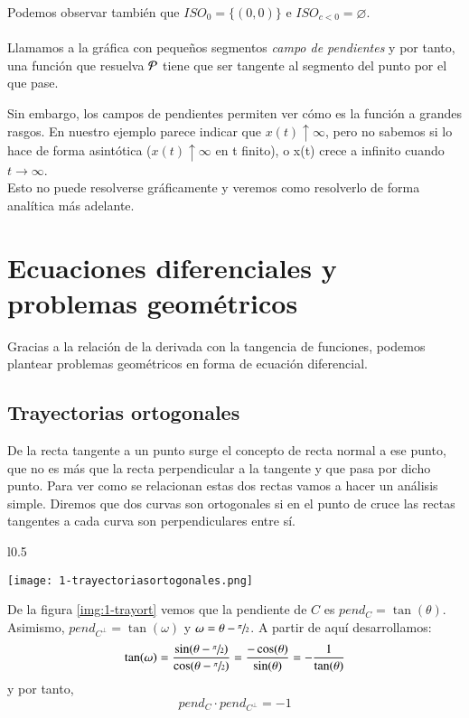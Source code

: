 \begin{eg}
\begin{minipage}[c]{0.65\textwidth}
        Podemos observar también que $ISO_0 = \{(0,0)\}$ e $ISO_{c < 0} = \varnothing$.\\\\ Llamamos a la gráfica con pequeños segmentos \textit{campo de pendientes} y por tanto, una función que resuelva $\P$ tiene que ser tangente al segmento del punto por el que pase.
    \end{minipage}
    Sin embargo, los campos de pendientes permiten ver cómo es la función a grandes rasgos. En nuestro ejemplo parece indicar que $x(t) \uparrow \infty$, pero no sabemos si lo hace de forma asintótica ($x(t) \uparrow \infty$ en t finito), o x(t) crece a infinito cuando $t \rightarrow \infty$.\\
    Esto no puede resolverse gráficamente y veremos como resolverlo de forma analítica más adelante.
\end{eg}

\section{Ecuaciones diferenciales y problemas geom\'{e}tricos}
Gracias a la relación de la derivada con la tangencia de funciones, podemos plantear problemas geométricos en forma de ecuación diferencial.
\subsection{Trayectorias ortogonales}
De la recta tangente a un punto surge el concepto de recta normal a ese punto, que no es más que la recta perpendicular a la tangente y que pasa por dicho punto. Para ver como se relacionan estas dos rectas vamos a hacer un análisis simple. Diremos que dos curvas son ortogonales si en el punto de cruce las rectas tangentes a cada curva son perpendiculares entre sí.
\begin{wrapfigure}[20]{l}{0.5\textwidth}
  \begin{center}
    \texttt{[image: 1-trayectoriasortogonales.png]}
  \end{center}
  \caption{Relaciones entre curvas ortogonales}\label{img:1-trayort}
\end{wrapfigure}
De la figura \ref{img:1-trayort} vemos que la pendiente de $C$ es $pend_C = \tan(\theta)$. Asimismo, $pend_{C^{\perp}} = \tan(\omega)$ y $\omega = \theta - \sfrac{\pi}{2}$. A partir de aquí desarrollamos:
$$
    \tan(\omega)=\frac{\sin(\theta-\sfrac{\pi}{2})}{\cos(\theta-\sfrac{\pi}{2})} = \frac{-\cos(\theta)}{\sin(\theta)} = -\frac{1}{\tan(\theta)}
$$
y por tanto,
\begin{equation} \label{eq:pendientes}
    pend_C \cdot pend_{C^{\perp}} = -1
\end{equation}

